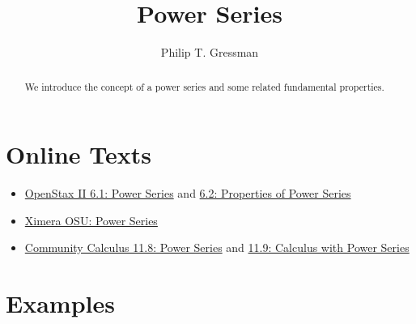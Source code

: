 \documentclass{ximera}
\title{Power Series}
\author{Philip T. Gressman}
\begin{document}
\begin{abstract}
We introduce the concept of a power series and some related fundamental properties.
\end{abstract}
\maketitle

\section*{Online Texts}
\begin{itemize}
\item \href{https://openstax.org/books/calculus-volume-2/pages/6-1-power-series-and-functions}{OpenStax II 6.1: Power Series} and \href{https://openstax.org/books/calculus-volume-2/pages/6-2-properties-of-power-series}{6.2: Properties of Power Series}
\item \href{https://ximera.osu.edu/mooculus/calculus2/powerSeries/titlePage}{Ximera OSU: Power Series}
\item \href{https://www.whitman.edu/mathematics/calculus_online/section11.08.html}{Community Calculus 11.8: Power Series} and \href{https://www.whitman.edu/mathematics/calculus_online/section11.09.html}{11.9: Calculus with Power Series}
\end{itemize}

\section*{Examples}

\begin{example}

\end{example}

\begin{example}

\end{example}
\end{document}
